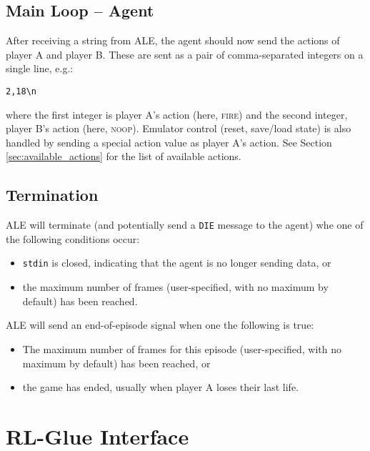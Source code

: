 \documentclass[12pt]{article}
\begin{document}
\subsection{Main Loop -- Agent}

After receiving a string from ALE, the agent should now send the actions of player A and player B.
These are sent as a pair of comma-separated integers on a single line, e.g.:

\begin{verbatim}
2,18\n
\end{verbatim}

\noindent where the first integer is player A's action (here, \textsc{fire}) and the second integer, player B's action (here, \textsc{noop}). Emulator control (reset, save/load state) is also handled by sending a special action value as player A's action. See Section \ref{sec:available_actions} for the list of available actions.

\subsection{Termination}\label{subsec:termination_conditions}

ALE will terminate (and potentially send a \verb+DIE+ message to the agent) whe one of the following conditions occur:

\begin{itemize}
  \item{\texttt{stdin} is closed, indicating that the agent is no longer sending data, or}
  \item{the maximum number of frames (user-specified, with no maximum by default) has been reached.}
\end{itemize}

ALE will send an end-of-episode signal when one the following is true:

\begin{itemize}
  \item{The maximum number of frames for this episode (user-specified, with no maximum by default) has been reached, or}
  \item{the game has ended, usually when player A loses their last life.}
\end{itemize}

\section{RL-Glue Interface}\label{sec:rlglue_interface}
\end{document}

